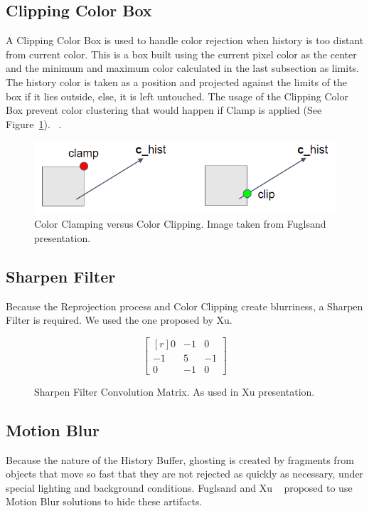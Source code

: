 \documentclass{cslthse-msc}
\begin{document}
\subsection{Clipping Color Box} 
A Clipping Color Box is used to handle color rejection when history is too distant from current color. This is a box built using the current pixel color as the center and the minimum and maximum color calculated in the last subsection as limits. The history color is taken as a position and projected against the limits of the box if it lies outside, else, it is left untouched. The usage of the Clipping Color Box prevent color clustering that would happen if Clamp is applied (See Figure~\ref{fig:clippingbox}). ~\cite{Fuglsand2016}.

\begin{figure}[!hbt]
	\centering
	\includegraphics[scale=0.4]{images/clipping_box.png}
	\caption{Color Clamping versus Color Clipping. Image taken from Fuglsand presentation. \protect\cite{Fuglsand2016}}\label{fig:clippingbox}
\end{figure}


\subsection{Sharpen Filter} 
Because the Reprojection process and Color Clipping create blurriness, a Sharpen Filter is required. We used the one proposed by Xu. ~\cite{XU2016}

\begin{figure}[!hbt]
	\centering
	\[
	\begin{bmatrix*}[r]
	0 & -1 &  0 \\
	-1 &  5 & -1 \\
	0 & -1 &  0
	\end{bmatrix*}
	\]
	\caption{Sharpen Filter Convolution Matrix. As used in Xu presentation. \protect\cite{XU2016}}
	\label{fig:sharpen}
\end{figure}

\subsection{Motion Blur}
Because the nature of the History Buffer, ghosting is created by fragments from objects that move so fast that they are not rejected as quickly as necessary, under special lighting and background conditions. Fuglsand and Xu ~\cite{Fuglsand2016,XU2016} proposed to use Motion Blur solutions to hide these artifacts.
\end{document}
